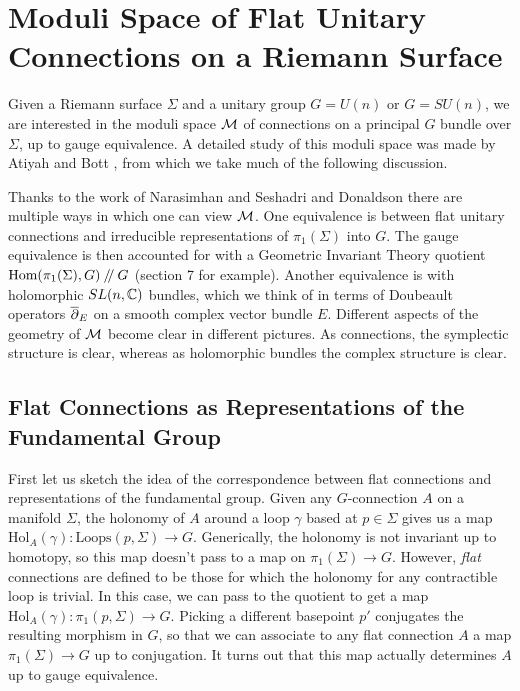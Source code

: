 \section{Moduli Space of Flat Unitary Connections on a Riemann Surface}
\label{s:vectorbundles}
	Given a Riemann surface $\Sigma$ and a unitary group $G=U(n)$ or $G=SU(n)$, we are interested in the moduli space $\mathcal{M}$ of connections on a principal $G$ bundle over $\Sigma$, up to gauge equivalence. A detailed study of this moduli space was made by Atiyah and Bott \cite{atiyah_yang-mills_1983}, from which we take much of the following discussion.
	
	Thanks to the work of Narasimhan and Seshadri and Donaldson \cite{donaldson_new_1983}\cite{narasimhan_stable_1965} there are multiple ways in which one can view $\mathcal{M}$. One equivalence is between flat unitary connections and irreducible representations of $\pi_1(\Sigma)$ into $G$. The gauge equivalence is then accounted for with a Geometric Invariant Theory quotient $\text{Hom}(\pi_1(\Sigma), G)\mathbin{/\mkern-4mu/} G$ \cite{thaddeus_geometric_1996}(section 7 for example). Another equivalence is with holomorphic $SL(n,\mathbb{C})$ bundles, which we think of in terms of Doubeault operators $\overline{\partial}_E$ on a smooth complex vector bundle $E$. Different aspects of the geometry of $\mathcal{M}$ become clear in different pictures. As connections, the symplectic structure is clear, whereas as holomorphic bundles the complex structure is clear.
	\subsection{Flat Connections as Representations of the Fundamental Group}
	First let us sketch the idea of the correspondence between flat connections and representations of the fundamental group. Given any $G$-connection $A$ on a manifold $\Sigma$, the holonomy of $A$ around a loop $\gamma$ based at $p\in \Sigma$ gives us a map $\text{Hol}_A(\gamma):\text{Loops}(p,\Sigma)\to G$. Generically, the holonomy is not invariant up to homotopy, so this map doesn't pass to a map on $\pi_1(\Sigma) \to G$. However, \emph{flat} connections are defined to be those for which the holonomy for any contractible loop is trivial. In this case, we can pass to the quotient to get a map $\text{Hol}_A(\gamma):\pi_1(p,\Sigma)\to G$. Picking a different basepoint $p'$ conjugates the resulting morphism in $G$, so that we can associate to any flat connection $A$ a map $\pi_1(\Sigma)\to G$ up to conjugation. It turns out that this map actually determines $A$ up to gauge equivalence.
	
